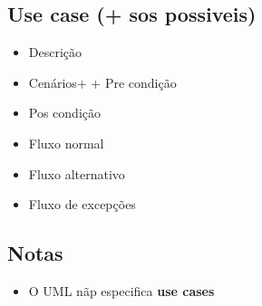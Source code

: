 \documentclass[11pt]{article}
\begin{document}
\subsection{Use case (+ sos possiveis)}
\label{sec:org2d80c5a}
\begin{itemize}
\item Descrição
\item Cenários+ + Pre condição
\item Pos condição
\item Fluxo normal
\item Fluxo alternativo
\item Fluxo de excepções
\end{itemize}

\subsection{Notas}
\label{sec:org349557f}
\begin{itemize}
\item O UML nãp especifica \textbf{use cases}
\end{itemize}
\end{document}
